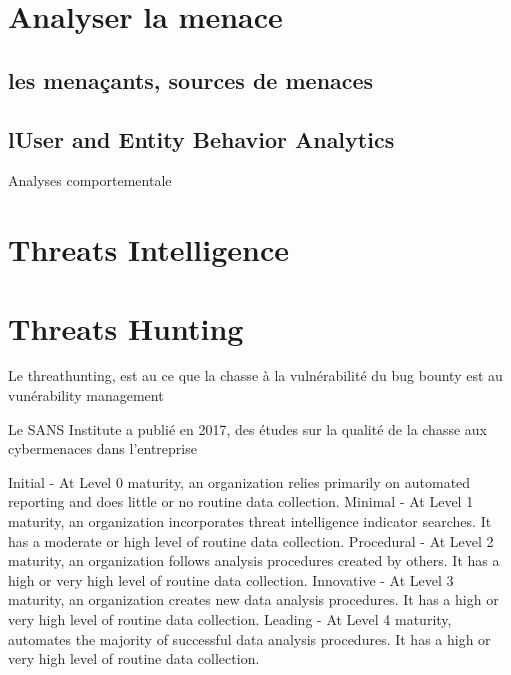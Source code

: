 

\section{Analyser la menace}



\subsection{les menaçants, sources de menaces}


\subsection{lUser and Entity Behavior Analytics}
Analyses comportementale

\section{Threats Intelligence}


\section{Threats Hunting}


Le threathunting, est au   ce que la chasse à la vulnérabilité du bug bounty est au vunérability management

Le SANS Institute a publié en 2017, des études sur la qualité de la chasse aux cybermenaces dans l'entreprise


Initial - At Level 0 maturity, an organization relies primarily on automated reporting and does little or no routine data collection.
Minimal - At Level 1 maturity, an organization incorporates threat intelligence indicator searches. It has a moderate or high level of routine data collection.
Procedural - At Level 2 maturity, an organization follows analysis procedures created by others. It has a high or very high level of routine data collection.
Innovative - At Level 3 maturity, an organization creates new data analysis procedures. It has a high or very high level of routine data collection.
Leading - At Level 4 maturity, automates the majority of successful data analysis procedures. It has a high or very high level of routine data collection.





